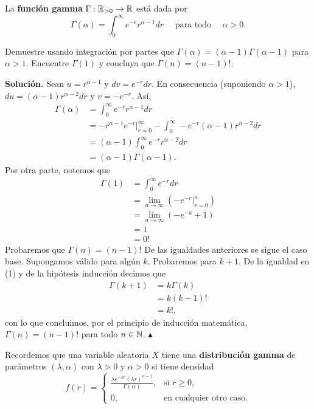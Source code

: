 \documentclass[11pt]{scrartcl}
\begin{document}
La \textbf{función gamma} $\Gamma: \mathbb R_{>0}\rightarrow \mathbb R$ está dada por
\begin{equation*}
    \Gamma(\alpha) = \int_{0}^{\infty}e^{-r}r^{\alpha-1}dr \quad \text{ para todo } \quad \alpha > 0.
\end{equation*}

\begin{mdframed}[style=mdpurplebox, frametitle={Ejercicio 04, Tarea 11, Probabilidad y Estadística I}]
    Demuestre usando integración por partes que $\Gamma(\alpha)=(\alpha-1)\Gamma(\alpha-1)$ para $\alpha > 1$. Encuentre
    $\Gamma(1)$ y concluya que $\Gamma(n)=(n-1)!$.
\end{mdframed}
\textbf{Solución.} Sean $u=r^{\alpha-1}$ y $dv=e^{-r}dr$. En consecuencia (suponiendo $\alpha >1$), $du=(\alpha-1)r^{\alpha-2}dr$ y $v=-e^{-r}$.
Así,
\begin{align*}
    \Gamma(\alpha) &= \int_{0}^{\infty}e^{-r}r^{\alpha-1}dr \\
    &= -r^{\alpha-1}e^{-r}\Big|_{r=0}^\infty -\int_{0}^{\infty}-e^{-r}(\alpha-1)r^{\alpha-2}dr \\
    &= (\alpha-1)\int_{0}^{\infty}e^{-r}r^{\alpha-2}dr \\
    &= (\alpha-1)\Gamma(\alpha-1). \tag{1}
\end{align*}
Por otra parte, notemos que
\begin{align*}
    \Gamma(1) &= \int_{0}^{\infty}e^{-r}dr \\
    &= \lim_{a \to \infty}\left(-e^{-r}\Big|_{r=0}^a\right) \\
    &= \lim_{a \to \infty}\left(-e^{-a}+1\right) \\
    &=1 \\
    &=0!
\end{align*}
Probaremos que $\Gamma(n)=(n-1)!$ De las igualdades anteriores se sigue el caso base. Supongamos válido para algún $k$. Probaremos para $k+1$. De la
igualdad en (1) y de la hipótesis inducción decimos que
\begin{align*}
    \Gamma(k+1) &= k\Gamma(k) \\
    &= k(k-1)! \\
    &= k!,
\end{align*}
con lo que concluimos, por el principio de inducción matemática, $\Gamma(n)=(n-1)!$ para todo $n \in \mathbb N$. $\blacktriangle$
\newpage

\noindent Recordemos que una variable aleatoria $X$ tiene una \textbf{distribución gamma} de parámetros $(\lambda,\alpha)$ con $\lambda>0$
y $\alpha>0$ si tiene densidad
\begin{equation*}
    f(r)=
    \begin{cases}
        \frac{\lambda e^{-\lambda r}(\lambda r)^{\alpha-1}}{\Gamma(\alpha)}, & \text{si } r\geq 0, \\%
        0, & \text{en cualquier otro caso.}
    \end{cases}
\end{equation*}
\end{document}
